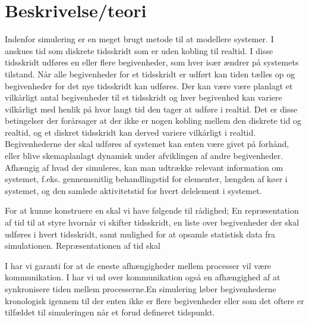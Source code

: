 \section{Beskrivelse/teori} \label{sec:des-teori}

\begin{shaded}
Indenfor simulering er \des en meget brugt metode til at modellere systemer. I 
\des anskues tid som diskrete tidsskridt som er uden kobling til realtid. I disse tidsskridt udføres en eller flere begivenheder, som hver især ændrer på systemets tilstand. Når alle begivenheder for et tidsskridt er udført kan tiden tælles op og begivenheder for det nye tidsskridt kan udføres. Der kan være være planlagt et vilkårligt antal begivenheder til et tidsskridt og hver begivenhed kan variere vilkårligt med henlik på hvor langt tid den tager at udføre i realtid. Det er disse betingelser der forårsager at der ikke er nogen kobling mellem den diskrete tid og realtid, og et diskret tidsskridt kan derved variere vilkårligt i realtid. Begivenhederne der skal udføres af systemet kan enten være givet på forhånd, eller blive skemaplanlagt dynamisk under afviklingen af andre begivenheder. 
Afhængig af hvad der simuleres, kan man udtrække relevant information om systemet, f.eks. gennemsnitlig behandlingstid for elementer, længden af køer i systemet, og den samlede aktivitetstid for hvert delelement i systemet.

For at kunne konstruere en \des skal vi have følgende til rådighed; En repræsentation af tid til at styre hvornår vi skifter tidsskridt, en liste over begivenheder der skal udføres i hvert tidsskridt, samt mulighed for at opsamle statistisk data fra simulationen. Repræsentationen af tid skal 


I \csp har vi garanti for at de eneste afhængigheder mellem processer vil være kommunikation. I \des har vi ud over kommunikation også en afhængighed af at synkronisere tiden mellem processerne.En simulering løber begivenhederne kronologisk igennem til der enten ikke er flere begivenheder eller som det oftere er tilfældet til simuleringen når et forud defineret tidspunkt.

\end{shaded}
